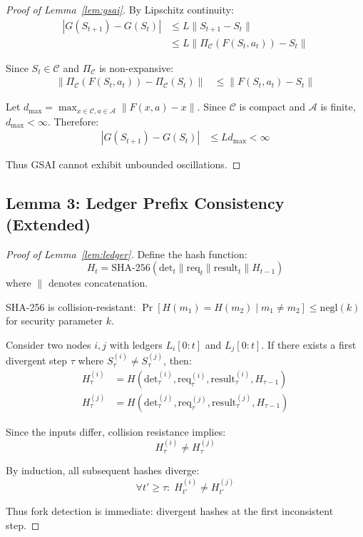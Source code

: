 \begin{proof}[Proof of Lemma~\ref{lem:gsai}]
By Lipschitz continuity:
\begin{align*}
    |G(S_{t+1}) - G(S_t)| &\leq L \|S_{t+1} - S_t\| \\
    &\leq L \|\Pi_{\mathcal{C}}(F(S_t,a_t)) - S_t\|
\end{align*}

Since $S_t \in \mathcal{C}$ and $\Pi_{\mathcal{C}}$ is non-expansive:
\begin{align*}
    \|\Pi_{\mathcal{C}}(F(S_t,a_t)) - \Pi_{\mathcal{C}}(S_t)\| &\leq \|F(S_t,a_t) - S_t\|
\end{align*}

Let $d_{\max} = \max_{x\in\mathcal{C}, a\in\mathcal{A}} \|F(x,a) - x\|$.
Since $\mathcal{C}$ is compact and $\mathcal{A}$ is finite, $d_{\max} < \infty$.
Therefore:
\begin{align*}
    |G(S_{t+1}) - G(S_t)| &\leq L d_{\max} < \infty
\end{align*}

Thus GSAI cannot exhibit unbounded oscillations.
\end{proof}

\subsection{Lemma 3: Ledger Prefix Consistency (Extended)}

\begin{proof}[Proof of Lemma~\ref{lem:ledger}]
Define the hash function:
\[
H_t = \text{SHA-256}(\text{det}_t \| \text{req}_t \| \text{result}_t \| H_{t-1})
\]
where $\|$ denotes concatenation.

SHA-256 is collision-resistant: $\Pr[H(m_1) = H(m_2) \mid m_1 \neq m_2] \leq \text{negl}(k)$
for security parameter $k$.

Consider two nodes $i,j$ with ledgers $L_i[0:t]$ and $L_j[0:t]$.
If there exists a first divergent step $\tau$ where
$S_\tau^{(i)} \neq S_\tau^{(j)}$, then:
\begin{align*}
    H_\tau^{(i)} &= H(\text{det}_\tau^{(i)}, \text{req}_\tau^{(i)}, \text{result}_\tau^{(i)}, H_{\tau-1}) \\
    H_\tau^{(j)} &= H(\text{det}_\tau^{(j)}, \text{req}_\tau^{(j)}, \text{result}_\tau^{(j)}, H_{\tau-1})
\end{align*}

Since the inputs differ, collision resistance implies:
\[
H_\tau^{(i)} \neq H_\tau^{(j)}
\]

By induction, all subsequent hashes diverge:
\[
\forall t' \geq \tau:\; H_{t'}^{(i)} \neq H_{t'}^{(j)}
\]

Thus fork detection is immediate: divergent hashes at the first
inconsistent step.
\end{proof}

